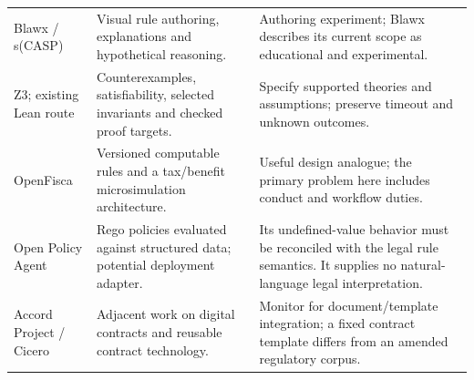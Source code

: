 \documentclass[12pt,a4paper,oneside,openany]{book}
\begin{document}
\begin{longtable}{P{0.19\textwidth}P{0.37\textwidth}P{0.34\textwidth}}
Blawx / s(CASP) & Visual rule authoring, explanations and hypothetical reasoning. & Authoring experiment; Blawx describes its current scope as educational and experimental. \citep{blawxcode,slaw2024}\\
Z3; existing Lean route & Counterexamples, satisfiability, selected invariants and checked proof targets. & Specify supported theories and assumptions; preserve timeout and unknown outcomes. \citep{z3code,localrepos}\\
OpenFisca & Versioned computable rules and a tax/benefit microsimulation architecture. & Useful design analogue; the primary problem here includes conduct and workflow duties. \citep{openfiscacode}\\
Open Policy Agent & Rego policies evaluated against structured data; potential deployment adapter. & Its undefined-value behavior must be reconciled with the legal rule semantics. It supplies no natural-language legal interpretation. \citep{opadocs}\\
Accord Project / Cicero & Adjacent work on digital contracts and reusable contract technology. & Monitor for document/template integration; a fixed contract template differs from an amended regulatory corpus. \citep{cicerocode}\\
\bottomrule
\end{longtable}
\endgroup
\end{document}
